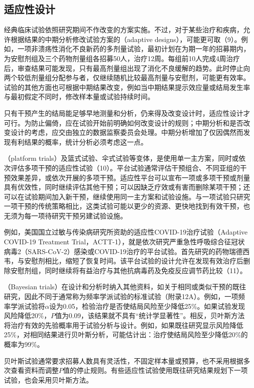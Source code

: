 \subsection{适应性设计}
经典临床试验依照研究期间不作改变的方案实施。不过，对于某些治疗和疾病，允许根据结果的中期分析修改试验方案的（adaptive designs），可能更可取（9）。例如，一项非溃疡性消化不良新药的多剂量试验，最初计划在为期一年的招募期内，为安慰剂组及三个药物剂量组各招募50人，治疗12周。每组前10人完成4周治疗后，审查结果可能发现，只有最高剂量组出现了消化不良缓解的趋势。此时停止向两个较低剂量组分配参与者，仅继续随机比较最高剂量与安慰剂，可能更有效率。试验的其他方面也可根据中期结果改变，例如当中期结果提示效应量或结局发生率与最初假定不同时，修改样本量或试验持续时间。

只有干预产生的结局能足够早地测量和分析，仍来得及改变设计时，适应性设计才可行。为防止偏倚，应在试验开始前明确如何改变设计的规则；中期分析和是否改变设计的考虑，应交由独立的数据监察委员会处理。中期分析增加了仅因偶然而发现有利结果的概率，统计分析必须考虑这一点。

（platform trials）及篮式试验、伞式试验等变体，是使用单一主方案，同时或依次评估多项干预的适应性试验（10）。平台试验通常评估干预组合、不同亚组的干预效果差异，或依次开展的多项干预。适应性平台可以宣布一项或多项干预或剂量具有优效性，同时继续评估其他干预；可以因缺乏疗效或有害而删除某项干预；还可以在试验期间加入新干预，继续使用同一主方案和试验设施。与一项试验只研究一项干预的传统策略相比，这类试验可能以更少的资源、更快地找到有效干预，也无须为每一项待研究干预另建试验设施。

例如，美国国立过敏与传染病研究所资助的适应性COVID-19治疗试验（Adaptive COVID-19 Treatment Trial，ACTT-1），就是依次研究严重急性呼吸综合征冠状病毒2（SARS-CoV-2）感染或COVID-19治疗的平台试验。首先研究的药物瑞德西韦，与安慰剂相比，缩短了恢复时间。该平台试验的设计允许在发现有效治疗后删除安慰剂组，同时继续将有益治疗与其他抗病毒药及免疫反应调节药比较（11）。

（Bayesian trials）在设计和分析时纳入其他资料，如关于相同或类似干预的既往研究，因此不同于通常称为频率学派试验的标准试验（附录12A）。例如，一项频率学派试验将$\alpha$设为0.05，检验治疗是否使结局风险至少降低25\%。如果试验发现风险降低20\%，$P$值为0.09，该结果就不具有“统计学显著性”。相反，贝叶斯方法将治疗有效的先验概率用于试验分析与设计。例如，如果既往研究显示风险降低25\%，对相同结果进行贝叶斯分析，可能估计出：治疗使结局风险至少降低20\%的概率为99\%。

贝叶斯试验通常要求招募人数具有灵活性，不固定样本量或预算，也不采用根据多次查看资料而调整$P$值的停止规则。有些适应性试验使用既往研究结果规划下一项试验，也会采用贝叶斯方法。

